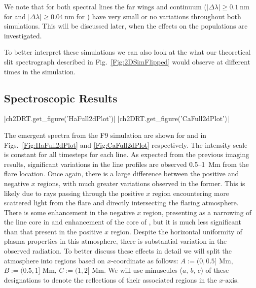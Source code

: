 We note that for both spectral lines the far wings and continuum ($|\Delta\lambda| \geq \SI{0.1}{\nano\metre}$ for \Ha{} and $|\Delta\lambda| \geq \SI{0.04}{\nano\metre}$ for \CaLine{}) have very small or no variations throughout both simulations.
This will be discussed later, when the effects on the populations are investigated.

To better interpret these simulations we can also look at the what our theoretical slit spectrograph described in Fig.~\ref{Fig:2DSimFlipped} would observe at different times in the simulation.

\subsection{Spectroscopic Results}

\py[2DRT]|ch2DRT.get_figure('HaFull2dPlot')|
\py[2DRT]|ch2DRT.get_figure('CaFull2dPlot')|

The emergent spectra from the F9 simulation are shown for \Ha{} and \CaLine{} in Figs.~\ref{Fig:HaFull2dPlot} and \ref{Fig:CaFull2dPlot} respectively.
The intensity scale is constant for all timesteps for each line.
As expected from the previous imaging results, significant variations in the line profiles are observed 0.5--\SI{1}{\mega\metre} from the flare location.
Once again, there is a large difference between the positive and negative $x$ regions, with much greater variations observed in the former.
This is likely due to rays passing through the positive $x$ region encountering more scattered light from the flare and directly intersecting the flaring atmosphere.
There is some enhancement in the negative $x$ region, presenting as a narrowing of the line core in \Ha{} and enhancement of the core of \CaLine{}, but it is much less significant than that present in the positive $x$ region.
Despite the horizontal uniformity of plasma properties in this atmosphere, there is substantial variation in the observed radiation.
To better discuss these effects in detail we will split the atmosphere into regions based on $x$-coordinate as follows: $A := (0, 0.5]$ \si{\mega\metre}, $B := (0.5, 1]$ \si{\mega\metre}, $C := (1, 2]$ \si{\mega\metre}.
We will use minuscules ($a$, $b$, $c$) of these designations to denote the reflections of their associated regions in the $x$-axis.

